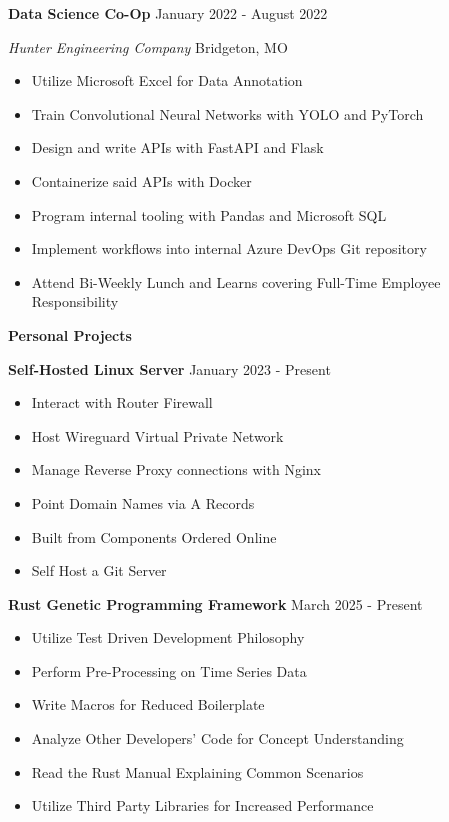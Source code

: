 \documentclass[11pt]{article}
\begin{document}

\textbf{Data Science Co-Op} \hfill January 2022 - August 2022

\textsl{Hunter Engineering Company} \hfill Bridgeton, MO
\begin{itemize}[noitemsep]
    \item Utilize Microsoft Excel for Data Annotation
    \item Train Convolutional Neural Networks with YOLO and PyTorch
    \item Design and write APIs with FastAPI and Flask
    \item Containerize said APIs with Docker
    \item Program internal tooling with Pandas and Microsoft SQL
    \item Implement workflows into internal Azure DevOps Git repository
    \item Attend Bi-Weekly Lunch and Learns covering Full-Time Employee Responsibility
\end{itemize}


\begin{center}
    \textbf{Personal Projects}
\end{center}

\textbf{Self-Hosted Linux Server} \hfill January 2023 - Present
\begin{itemize}[noitemsep]
    \item Interact with Router Firewall
    \item Host Wireguard Virtual Private Network
    \item Manage Reverse Proxy connections with Nginx
    \item Point Domain Names via A Records
    \item Built from Components Ordered Online
    \item Self Host a Git Server
\end{itemize}

\textbf{Rust Genetic Programming Framework} \hfill March 2025 - Present
\begin{itemize}[noitemsep]
    \item Utilize Test Driven Development Philosophy
    \item Perform Pre-Processing on Time Series Data
    \item Write Macros for Reduced Boilerplate
    \item Analyze Other Developers' Code for Concept Understanding
    \item Read the Rust Manual Explaining Common Scenarios
    \item Utilize Third Party Libraries for Increased Performance
\end{itemize}
\end{document}
